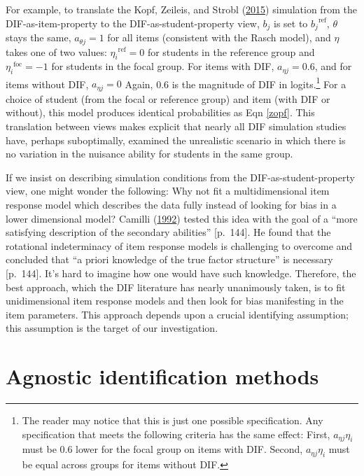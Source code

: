 \documentclass[
  11pt,
]{article}
\begin{document}
For example, to translate the Kopf, Zeileis, and Strobl (\protect\hyperlink{ref-kopf2015framework}{2015}) simulation from the DIF-as-item-property to the DIF-as-student-property view, \(b_j\) is set to \({b_j}^{\text{ref}}\), \(\theta\) stays the same, \(a_{\theta j} = 1\) for all items (consistent with the Rasch model), and \(\eta\) takes one of two values: \({\eta_i}^{\text{ref}} = 0\) for students in the reference group and \({\eta_i}^{\text{foc}} = -1\) for students in the focal group. For items with DIF, \(a_{\eta j} = 0.6\), and for items without DIF, \(a_{\eta j} = 0\) Again, 0.6 is the magnitude of DIF in logits.\footnote{The reader may notice that this is just one possible specification. Any specification that meets the following criteria has the same effect: First, \(a_{\eta j}\eta_i\) must be 0.6 lower for the focal group on items with DIF. Second, \(a_{\eta j}\eta_i\) must be equal across groups for items without DIF.} For a choice of student (from the focal or reference group) and item (with DIF or without), this model produces identical probabilities as Eqn \ref{zopf}. This translation between views makes explicit that nearly all DIF simulation studies have, perhaps suboptimally, examined the unrealistic scenario in which there is no variation in the nuisance ability for students in the same group.

If we insist on describing simulation conditions from the DIF-as-student-property view, one might wonder the following: Why not fit a multidimensional item response model which describes the data fully instead of looking for bias in a lower dimensional model? Camilli (\protect\hyperlink{ref-camilli1992conceptual}{1992}) tested this idea with the goal of a \enquote{more satisfying description of the secondary abilities} {[}p.~144{]}. He found that the rotational indeterminacy of item response models is challenging to overcome and concluded that \enquote{a priori knowledge of the true factor structure} is necessary {[}p.~144{]}. It's hard to imagine how one would have such knowledge. Therefore, the best approach, which the DIF literature has nearly unanimously taken, is to fit unidimensional item response models and then look for bias manifesting in the item parameters. This approach depends upon a crucial identifying assumption; this assumption is the target of our investigation.

\hypertarget{agnostic-identification-methods}{%
\section{Agnostic identification methods}\label{agnostic-identification-methods}}
\end{document}
